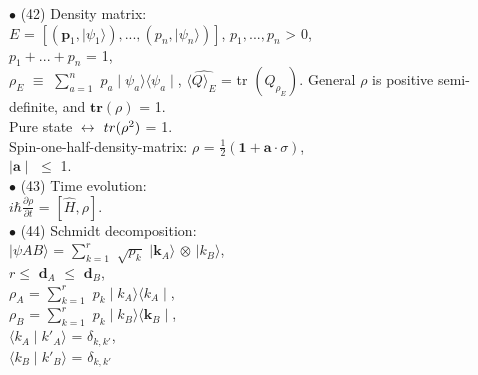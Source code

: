 \documentclass[a4paper, 10pt, onepage]{elegantbook}
\begin{document}
{$\bullet$ (42) Density matrix: \\ 
 
$\mathit E$ = $[ (\mathbf p_1, \mid \psi_1 \rangle), ..., ( \mathit p_n, \mid \psi_n \rangle)]$,  
$\mathit p_1,...,\mathit p_n$ > 0, \\ 

$p_1 +...+ p_n$ = 1,  \\ 
   
$\rho_\mathit E$ $\equiv$ $\sum_{a = 1}^n$ $\mathit p_a \mid \psi_a \rangle \langle \psi_a \mid$, 
$\langle \hat{\mathit Q \rangle_\mathit E}$ = tr $ (\mathit Q_{\rho_{\mathit E}})$.   
General $\rho$ is positive semi-definite, and $\mathbf{tr}(\rho)$ = 1. \\

Pure state $\longleftrightarrow$ $\mathbf \mathbf{tr}(\rho^2)$ = 1.  \\
   
Spin-one-half-density-matrix: $\rho$ = $\frac{1}{2} ( \mathbf{1} + \mathbf a \cdot \sigma)$,  \\

$\mid \mathbf a \mid$ $\leq$ 1.  \\

$\bullet$ (43) Time evolution:  \\

$i \hbar \frac{\partial \rho}{\partial t}$ = $ [ \hat{H}, \rho]$.  \\

$\bullet$ (44) Schmidt decomposition: \\ 

$\mid  \psi AB \rangle$ = $ \sum_{k = 1}^r$ $\sqrt {\mathit p_k}$ $\mid \mathbf k_A \rangle$ $\otimes$ $\mid  \mathit k_B \rangle$,  \\

$r \leq$ $\mathbf d_A$ $\leq$ $\mathbf d_B$, \\

$\rho_A$ = $ \sum_{k =1}^r$ $ \mathit p_k \mid \mathit k_A \rangle \langle \mathit k_A \mid$,  \\  

$\rho_B$ = $ \sum_{k =1}^r$ $ \mathit p_k \mid \mathit k_B  \rangle \langle \mathbf k_B \mid$,  \\  

$\langle k_A \mid k'_A \rangle$ = $\delta_{k,k'}$, \\  

$\langle k_B \mid k'_B \rangle$ = $\delta_{k,k'}$  \\

}
\end{document}
